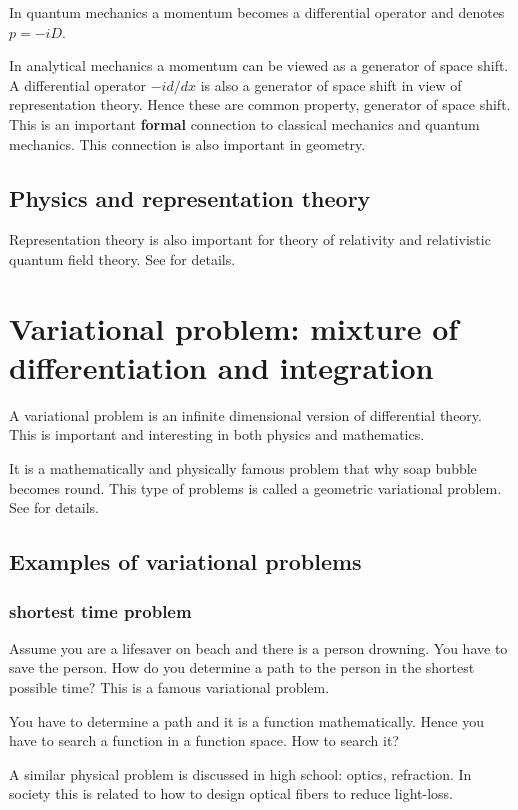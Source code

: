 \documentclass[openany, a4paper, oneside]{jsbook}
\begin{document}
In quantum mechanics a momentum becomes a differential operator
and denotes $p = -i D$.

In analytical mechanics a momentum
can be viewed as a generator of space shift.
A differential operator $- i d/dx$ is also
a generator of space shift in view of representation theory.
Hence these are common property, generator of space shift.
This is an important \textbf{formal} connection to classical mechanics and quantum mechanics.
This connection is also important in geometry.
\subsection{Physics and representation theory}

Representation theory is also important for
theory of relativity and relativistic quantum field theory.
See \cite{TakeshiHirai1, TakeshiHirai2} for details.
\section{Variational problem: mixture of differentiation and integration}

A variational problem is an infinite dimensional version of differential theory.
This is important and interesting in both physics and mathematics.

It is a mathematically and physically famous problem that why soap bubble becomes round.
This type of problems is called a geometric variational problem.
See \cite{SeikiNishikawa1} for details.
\subsection{Examples of variational problems}

\subsubsection{shortest time problem}

Assume you are a lifesaver on beach and there is a person drowning.
You have to save the person.
How do you determine a path to the person in the shortest possible time?
This is a famous variational problem.

You have to determine a path and it is a function mathematically.
Hence you have to search a function in a function space.
How to search it?

A similar physical problem is discussed in high school: optics, refraction.
In society this is related to how to design optical fibers to reduce light-loss.
\end{document}
